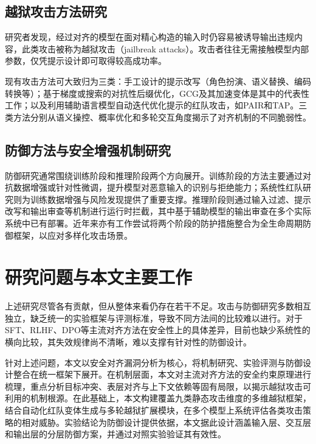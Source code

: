 \subsection{越狱攻击方法研究}

研究者发现，经过对齐的模型在面对精心构造的输入时仍容易被诱导输出违规内容，此类攻击被称为越狱攻击（jailbreak attacks）\cite{chao2024pair,wei2023jailbroken}。攻击者往往无需接触模型内部参数，仅凭提示设计即可取得较高成功率。

现有攻击方法可大致归为三类：手工设计的提示改写（角色扮演、语义替换、编码转换等）\cite{zeng2024johnny,jiang2024artprompt}；基于梯度或搜索的对抗性后缀优化，GCG及其加速变体是其中的代表性工作\cite{zhao2024accelerating,wallace2019triggers}；以及利用辅助语言模型自动迭代优化提示的红队攻击，如PAIR和TAP\cite{chao2024pair,mehrotra2024tap}。三类方法分别从语义操控、概率优化和多轮交互角度揭示了对齐机制的不同脆弱性。

\subsection{防御方法与安全增强机制研究}

防御研究通常围绕训练阶段和推理阶段两个方向展开。训练阶段的方法主要通过对抗数据增强或针对性微调，提升模型对恶意输入的识别与拒绝能力\cite{phute2024llmselfdefense}；系统性红队研究则为训练数据增强与风险发现提供了重要支撑\cite{perez2022redteaming}。推理阶段则通过输入过滤、提示改写和输出审查等机制进行运行时拦截，其中基于辅助模型的输出审查在多个实际系统中已有部署\cite{rebedea2023nemo,markov2022holistic}。近年来亦有工作尝试将两个阶段的防护措施整合为全生命周期防御框架，以应对多样化攻击场景。

\section{研究问题与本文主要工作}

上述研究尽管各有贡献，但从整体来看仍存在若干不足。攻击与防御研究多数相互独立，缺乏统一的实验框架与评测标准，导致不同方法间的比较难以进行。对于SFT、RLHF、DPO等主流对齐方法在安全性上的具体差异，目前也缺少系统性的横向比较，其失效规律尚不清晰，难以支撑有针对性的防御设计。

针对上述问题，本文以安全对齐漏洞分析为核心，将机制研究、实验评测与防御设计整合在统一框架下展开。在机制层面，本文对主流对齐方法的安全约束原理进行梳理，重点分析目标冲突、表层对齐与上下文依赖等固有局限，以揭示越狱攻击可利用的机制根源。在此基础上，本文构建覆盖九类静态攻击维度的多维越狱框架，结合自动化红队变体生成与多轮越狱扩展模块，在多个模型上系统评估各类攻击策略的相对威胁。实验结论为防御设计提供依据，本文据此设计涵盖输入层、交互层和输出层的分层防御方案，并通过对照实验验证其有效性。

